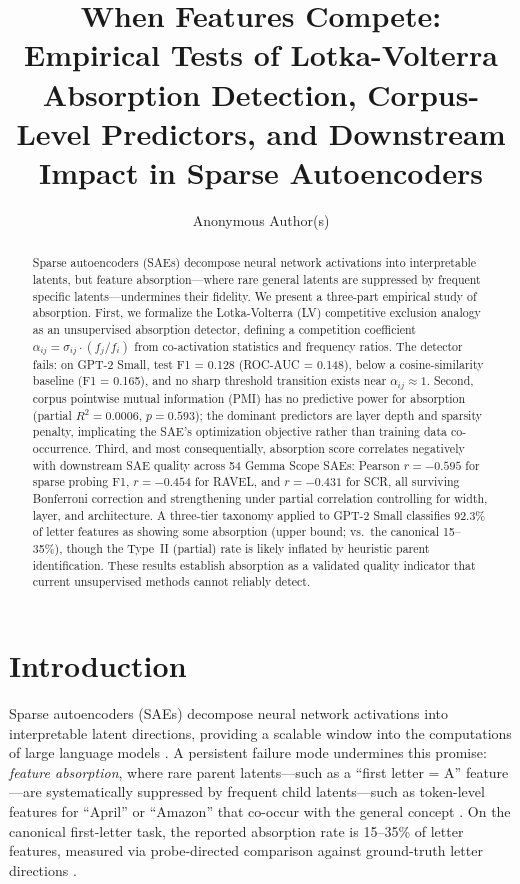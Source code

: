 \documentclass{article}
\title{When Features Compete: Empirical Tests of Lotka-Volterra Absorption Detection, Corpus-Level Predictors, and Downstream Impact in Sparse Autoencoders}
\author{%
  Anonymous Author(s)
}
\begin{document}
\maketitle

\begin{abstract}
Sparse autoencoders (SAEs) decompose neural network activations into interpretable latents, but feature absorption---where rare general latents are suppressed by frequent specific latents---undermines their fidelity. We present a three-part empirical study of absorption. First, we formalize the Lotka-Volterra (LV) competitive exclusion analogy as an unsupervised absorption detector, defining a competition coefficient $\alpha_{ij} = \sigma_{ij} \cdot (f_j / f_i)$ from co-activation statistics and frequency ratios. The detector fails: on GPT-2 Small, test F1 = 0.128 (ROC-AUC = 0.148), below a cosine-similarity baseline (F1 = 0.165), and no sharp threshold transition exists near $\alpha_{ij} \approx 1$. Second, corpus pointwise mutual information (PMI) has no predictive power for absorption (partial $R^2 = 0.0006$, $p = 0.593$); the dominant predictors are layer depth and sparsity penalty, implicating the SAE's optimization objective rather than training data co-occurrence. Third, and most consequentially, absorption score correlates negatively with downstream SAE quality across 54 Gemma Scope SAEs: Pearson $r = -0.595$ for sparse probing F1, $r = -0.454$ for RAVEL, and $r = -0.431$ for SCR, all surviving Bonferroni correction and strengthening under partial correlation controlling for width, layer, and architecture. A three-tier taxonomy applied to GPT-2 Small classifies 92.3\% of letter features as showing some absorption (upper bound; vs.\ the canonical 15--35\%), though the Type~II (partial) rate is likely inflated by heuristic parent identification. These results establish absorption as a validated quality indicator that current unsupervised methods cannot reliably detect.
\end{abstract}

\section{Introduction}
\label{sec:intro}

Sparse autoencoders (SAEs) decompose neural network activations into interpretable latent directions, providing a scalable window into the computations of large language models \citep{bricken2023monosemanticity,cunningham2023sparse}. A persistent failure mode undermines this promise: \emph{feature absorption}, where rare parent latents---such as a ``first letter = A'' feature---are systematically suppressed by frequent child latents---such as token-level features for ``April'' or ``Amazon'' that co-occur with the general concept \citep{chanin2024absorption}. On the canonical first-letter task, the reported absorption rate is 15--35\% of letter features, measured via probe-directed comparison against ground-truth letter directions \citep{chanin2024absorption}.
\end{document}
